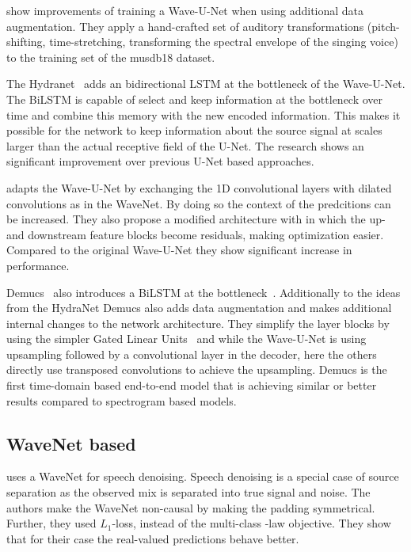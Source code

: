 \textcite{cohen-hadriaImproving2019} show improvements of training a Wave-U-Net when using additional data augmentation. They apply a hand-crafted set of auditory transformations (pitch-shifting, time-stretching, transforming the spectral envelope of the singing voice) to the training set of the musdb18 dataset.

The Hydranet~\cite{kaspersenHydraNet2019} adds an bidirectional LSTM at the bottleneck of the Wave-U-Net. The BiLSTM is capable of select and keep information at the bottleneck over time and combine this memory with the new encoded information. This makes it possible for the network to keep information about the source signal at scales larger than the actual receptive field of the U-Net. The research shows an significant improvement over previous U-Net based approaches.

\textcite{narayanaswamyAudio2019} adapts the Wave-U-Net by exchanging the 1D convolutional layers with dilated convolutions as in the WaveNet. By doing so the context of the predcitions can be increased. They also propose a modified architecture with in which the up- and downstream feature blocks become residuals, making optimization easier. Compared to the original Wave-U-Net they show significant increase in performance.

Demucs~\cite{defossezDemucs2019} also introduces a BiLSTM at the bottleneck~\cite{defossezSING2018}. Additionally to the ideas from the HydraNet Demucs also adds data augmentation and makes additional internal changes to the network architecture. They simplify the layer blocks by using the simpler Gated Linear Units~\cite{dauphinLanguage2017} and while the Wave-U-Net is using upsampling followed by a convolutional layer in the decoder, here the others directly use transposed convolutions to achieve the upsampling. Demucs is the first time-domain based end-to-end model that is achieving similar or better results compared to spectrogram based models.

\subsection{WaveNet based}
\textcite{rethageWavenet2018} uses a WaveNet for speech denoising. Speech denoising is a special case of source separation as the observed mix is separated into true signal and noise. The authors make the WaveNet non-causal by making the padding symmetrical. Further, they used \(L_1\)-loss, instead of the multi-class \μ-law objective. They show that for their case the real-valued predictions behave better.

